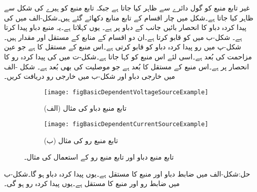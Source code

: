 غیر تابع منبع کو گول دائرے سے ظاہر کیا جاتا ہے جبکہ تابع منبع کو ہیرے کی شکل سے ظاہر کیا جاتا ہے۔شکل  میں چار اقسام کے تابع منابع دکھائے گئے ہیں۔شکل-الف میں  کی پیدا کردہ دباو کا انحصار بائیں جانب  کے دباو  پر ہے۔ یوں   کہلاتا ہے۔یہ منبع  دباو پیدا کرتا ہے۔ شکل-ب میں  کو  قابو کرتا ہے۔ان دو اقسام کے منابع کے مستقل  اور   مقدار ہیں۔شکل-پ میں  رو پیدا کردہ دباو کو قابو کرتی ہے۔اس منبع کے مستقل  کا   ہے جو عین مزاحمت کی بُعد ہے۔اسی لئے اس منبع کو  کہا جاتا ہے۔شکل-ت میں  کی پیدا کردہ رو کا انحصار  پر ہے۔اس منبع کے مستقل  کا بُعد  ہے جو موصلیت کی بھی بُعد ہے۔
شکل -الف میں خارجی دباو اور شکل-ب میں خارجی رو دریافت کریں۔

\begin{figure}
\centering
\begin{subfigure}{0.5\textwidth}
\centering
\texttt{[image: figBasicDependentVoltageSourceExample]}
\caption*{(الف) تابع منبع دباو کی مثال}
\end{subfigure}%
%
\begin{subfigure}{0.5\textwidth}
\centering
\texttt{[image: figBasicDependentCurrentSourceExample]}
\caption*{(ب) تابع منبع رو کی مثال}
\end{subfigure}%
\caption{تابع منبع دباو اور تابع منبع رو کے استعمال کی مثال۔}
\label{شکل_تابع_منبع_دباو_اور_رو_استعمال}
\end{figure} 

حل:شکل-الف میں ضابط دباو  اور منبع کا مستقل  ہے۔یوں پیدا کردہ دباو  ہو گا۔شکل-ب میں ضابط رو  اور منبع کا مستقل  ہے۔یوں پیدا کردہ رو  ہو گی۔



